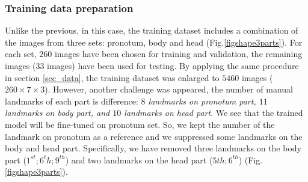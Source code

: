 \documentclass[10pt]{article}
\begin{document}


\subsubsection{Training data preparation}
Unlike the previous, in this case, the training dataset includes a combination of the images from three sets: pronotum, body and head (Fig.\ref{figshape3parts}). For each set, $260$ images have been chosen for training and validation, the remaining images ($33$ images) have been used for testing. By applying the same procedure in section \ref{sec_data}, the training dataset was enlarged to $5460$ images ($260 \times 7 \times 3$). However, another challenge was appeared, the number of manual landmarks of each part is difference: \textit{$8$ landmarks on pronotum part, $11$ landmarks on body part, and $10$ landmarks on head part}. We see that the trained model will be fine-tuned on pronotum set. So, we kept the number of the landmark on pronotum as a reference and we suppressed some landmarks on the body and head part. Specifically, we have removed three landmarks on the body part ($1^{st}; 6^{t}h; 9^{th}$) and two landmarks on the head part ($5{th}; 6^{th}$) (Fig.\ref{figshape3parts}).
\end{document}
